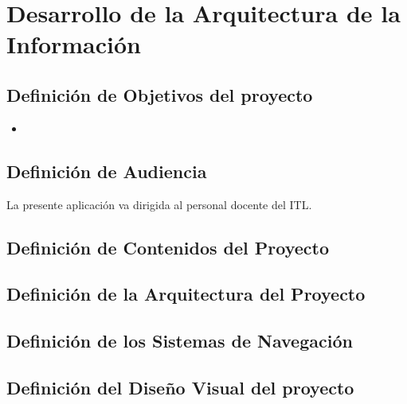\chapter{Desarrollo de la Arquitectura de la Información}

\section{Definición de Objetivos del proyecto}
\begin{itemize}
	\item 
\end{itemize}

\section{Definición de Audiencia}
La presente aplicación va dirigida al personal docente del ITL.

\section{Definición de Contenidos del Proyecto}


\section{Definición de la Arquitectura del Proyecto}


\section{Definición de los Sistemas de Navegación}


\section{Definición del Diseño Visual del proyecto}
